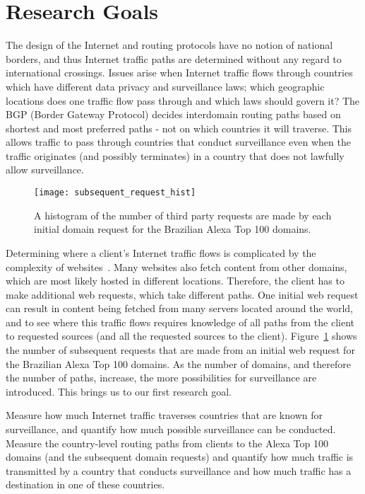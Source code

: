 \section{Research Goals}
\label{problem}

The design of the Internet and routing protocols have no notion of national borders, and thus Internet traffic paths are determined without any regard to international crossings.  Issues arise when Internet traffic flows through countries which have different data privacy and surveillance laws; which geographic locations does one traffic flow pass through and which laws should govern it?  The BGP (Border Gateway Protocol) decides interdomain routing paths based on shortest and most preferred paths - not on which countries it will traverse.  This allows traffic to pass through countries that conduct surveillance even when the traffic originates (and possibly terminates) in a country that does not lawfully allow surveillance.  

\begin{figure}
\centering
\texttt{[image: subsequent\_request\_hist]}
\caption{A histogram of the number of third party requests are made by each initial domain request for the Brazilian Alexa Top 100 domains.}
\label{fig:domains}
\end{figure}

Determining where a client's Internet traffic flows is complicated by the complexity of websites~\cite{butkiewicz2011understanding}.  Many websites also fetch content from other domains, which are most likely hosted in different locations.  Therefore, the client has to make additional web requests, which take different paths.  One initial web request can result in content being fetched from many servers located around the world, and to see where this traffic flows requires knowledge of all paths from the client to requested sources (and all the requested sources to the client).  Figure~\ref{fig:domains} shows the number of subsequent requests that are made from an initial web request for the Brazilian Alexa Top 100 domains.  As the number of domains, and therefore the number of paths, increase, the more possibilities for surveillance are introduced.  This brings us to our first research goal.

\begin{thm}
Measure how much Internet traffic traverses countries that are known for surveillance, and quantify how much possible surveillance can be conducted.  Measure the country-level routing paths from clients to the Alexa Top 100 domains (and the subsequent domain requests) and quantify how much traffic is transmitted by a country that conducts surveillance and how much traffic has a destination in one of these countries.
\end{thm}


